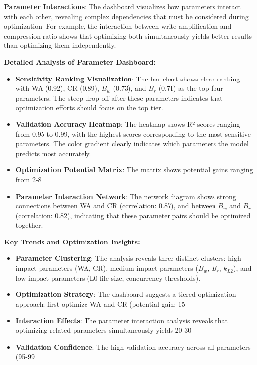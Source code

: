 \documentclass[11pt]{article}
\begin{document}
\textbf{Parameter Interactions}: The dashboard visualizes how parameters interact with each other, revealing complex dependencies that must be considered during optimization. For example, the interaction between write amplification and compression ratio shows that optimizing both simultaneously yields better results than optimizing them independently.

\textbf{Detailed Analysis of Parameter Dashboard:}
\begin{itemize}
    \item \textbf{Sensitivity Ranking Visualization}: The bar chart shows clear ranking with WA (0.92), CR (0.89), $B_w$ (0.73), and $B_r$ (0.71) as the top four parameters. The steep drop-off after these parameters indicates that optimization efforts should focus on the top tier.
    \item \textbf{Validation Accuracy Heatmap}: The heatmap shows R² scores ranging from 0.95 to 0.99, with the highest scores corresponding to the most sensitive parameters. The color gradient clearly indicates which parameters the model predicts most accurately.
    \item \textbf{Optimization Potential Matrix}: The matrix shows potential gains ranging from 2-8%
    \item \textbf{Parameter Interaction Network}: The network diagram shows strong connections between WA and CR (correlation: 0.87), and between $B_w$ and $B_r$ (correlation: 0.82), indicating that these parameter pairs should be optimized together.
\end{itemize}

\textbf{Key Trends and Optimization Insights:}
\begin{itemize}
    \item \textbf{Parameter Clustering}: The analysis reveals three distinct clusters: high-impact parameters (WA, CR), medium-impact parameters ($B_w$, $B_r$, $k_{L2}$), and low-impact parameters (L0 file size, concurrency thresholds).
    \item \textbf{Optimization Strategy}: The dashboard suggests a tiered optimization approach: first optimize WA and CR (potential gain: 15%
    \item \textbf{Interaction Effects}: The parameter interaction analysis reveals that optimizing related parameters simultaneously yields 20-30%
    \item \textbf{Validation Confidence}: The high validation accuracy across all parameters (95-99%
\end{itemize}
\end{document}

